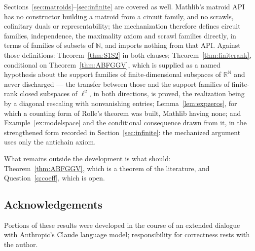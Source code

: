 \documentclass[11pt,reqno]{amsart}
\theoremstyle{definition}
\newcommand{\N}{\mathbb{N}}
\newcommand{\R}{\mathbb{R}}
\begin{document}
Sections~\ref{sec:matroids}--\ref{sec:infinite} are covered as well.
Mathlib's matroid API has no constructor building a matroid from a circuit
family, and no scrawls, cofinitary duals or representability; the
mechanization therefore defines circuit families, independence, the maximality
axiom and scrawl families directly, in terms of families of subsets of $\N$,
and imports nothing from that API. Against those definitions:
Theorem~\ref{thm:S1S2} in both clauses; Theorem~\ref{thm:finiterank},
conditional on Theorem~\ref{thm:ABFGGV}, which is supplied as a named
hypothesis about the support families of finite-dimensional subspaces of
$\R^{\N}$ and never discharged --- the transfer between those and the support
families of finite-rank closed subspaces of $\ell^2$, in both directions, is
proved, the realization being by a diagonal rescaling with nonvanishing
entries; Lemma~\ref{lem:expzeros}, for which a counting form of Rolle's
theorem was built, Mathlib having none; and Example~\ref{ex:modelspace} and
the conditional consequence drawn from it, in the strengthened form recorded
in Section~\ref{sec:infinite}: the mechanized argument uses only the antichain
axiom.

What remains outside the development is what should: Theorem~\ref{thm:ABFGGV},
which is a theorem of the literature, and Question~\ref{q:coeff}, which is
open.

\subsection*{Acknowledgements}
Portions of these results were developed in the course of an extended dialogue
with Anthropic's Claude language model; responsibility for correctness rests
with the author.
\end{document}
